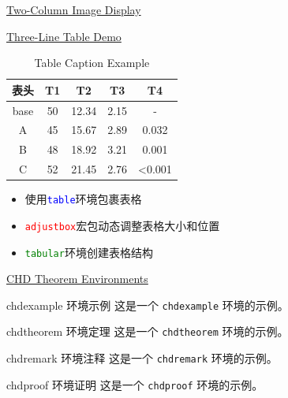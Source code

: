 \documentclass[11pt,aspectratio=43,xcolor={dvipsnames},hyperref={pdftex,pdfpagemode=UseNone,hidelinks,pdfdisplaydoctitle=true},usepdftitle=false]{ctexbeamer}
\begin{document}
\begin{frame}{\underline{Two-Column Image Display}}
  \vspace{0.5cm}
\end{frame}

\begin{frame}{\underline{Three-Line Table Demo}}
  \centering
  
\begin{table}[h]
  \centering
  \caption{Table Caption Example}
  \begin{adjustbox}{width=0.5\textwidth,center}
    \begin{tabular}{c|c|c|c|c}
      \toprule
      \textbf{表头} & \textbf{T1} & \textbf{T2} & \textbf{T3} & \textbf{T4} \\
      \midrule
      base & 50 & 12.34 & 2.15 & - \\
      A & 45 & 15.67 & 2.89 & 0.032 \\
      B & 48 & 18.92 & 3.21 & 0.001 \\
      C & 52 & 21.45 & 2.76 & <0.001 \\
      \bottomrule
    \end{tabular}
  \end{adjustbox}
\end{table} 
  \vspace{0.3cm}
  
  \begin{itemize}
    \item 使用\texttt{\textcolor{blue}{table}}环境包裹表格
    \item \texttt{\textcolor{red}{adjustbox}}宏包动态调整表格大小和位置
    \item \texttt{\textcolor{green}{tabular}}环境创建表格结构
  \end{itemize}
\end{frame}

\begin{frame}{\underline{CHD Theorem Environments}}
  \begin{chdexample}{chdexample 环境示例}
    这是一个 \texttt{chdexample} 环境的示例。
  \end{chdexample}
  \begin{chdtheorem}{chdtheorem 环境定理}
    这是一个 \texttt{chdtheorem} 环境的示例。
  \end{chdtheorem}
  \begin{chdremark}{chdremark 环境注释}
    这是一个 \texttt{chdremark} 环境的示例。
  \end{chdremark}
  \begin{chdproof}{chdproof 环境证明}
    这是一个 \texttt{chdproof} 环境的示例。
  \end{chdproof}
\end{frame}
\end{document}
